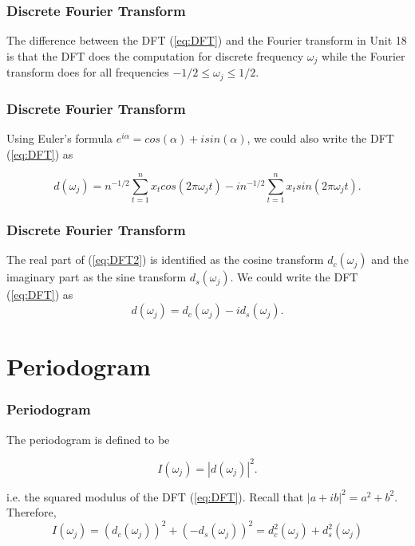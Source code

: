 \documentclass[%
xcolor=pdftex]{beamer}
\begin{document}
\begin{frame}
\frametitle{Discrete Fourier Transform}

The difference between the DFT (\ref{eq:DFT}) and the Fourier transform
in Unit 18 is that the DFT does the computation for
discrete frequency $\omega_j$ while the Fourier transform does for
all frequencies $-1/2 \leq \omega_j \leq 1/2$.

\end{frame}

\begin{frame}
\frametitle{Discrete Fourier Transform}

Using Euler's formula $e^{i\alpha}=cos(\alpha)+i sin(\alpha)$, we could also write the DFT (\ref{eq:DFT}) as

\begin{equation} \label{eq:DFT2}
d(\omega_j)=n^{-1/2} \sum_{t=1}^n x_t cos(2 \pi \omega_j t)-i n^{-1/2} \sum_{t=1}^n x_t sin(2 \pi \omega_j t).
\end{equation}

\end{frame}

\begin{frame}
\frametitle{Discrete Fourier Transform}

The real part of (\ref{eq:DFT2}) is identified as the cosine transform $d_c(\omega_j)$ and the imaginary part as the sine transform $d_s(\omega_j)$.  We could write the DFT (\ref{eq:DFT}) as
$$
d(\omega_j)=d_c(\omega_j)-i d_s(\omega_j).
$$
\end{frame}

\section{Periodogram}
\frame{\tableofcontents[currentsection]}

\begin{frame}
\frametitle{Periodogram}

The periodogram is defined to be

\begin{equation} \label{eq:period}
I(\omega_j) =|d(\omega_j)|^2.
\end{equation}

i.e. the squared modulus of the DFT (\ref{eq:DFT}). Recall that $|a+ib|^2=a^2+b^2$.  Therefore,
$$
I(\omega_j)=\left(d_c(\omega_j)\right)^2+\left(-d_s(\omega_j)\right)^2=d^2_c(\omega_j)+d^2_s(\omega_j)
$$

\end{frame}
\end{document}
